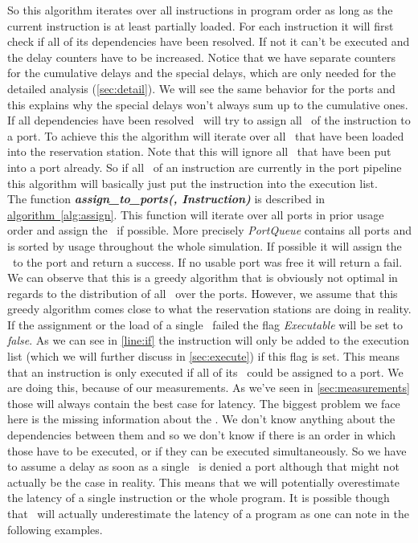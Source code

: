 So this algorithm iterates over all instructions in program order as long as the current instruction is at least partially loaded. For each instruction it will first check if all of its dependencies have been resolved. If not it can't be executed and the delay counters have to be increased. Notice that we have separate counters for the cumulative delays and the special delays, which are only needed for the detailed analysis (\autoref{sec:detail}). We will see the same behavior for the ports and this explains why the special delays won't always sum up to the cumulative ones.\\
If all dependencies have been resolved \suaca\ will try to assign all \microops\ of the instruction to a port. To achieve this the algorithm will iterate over all \microops\ that have been loaded into the reservation station. Note that this will ignore all \microops\ that have been put into a port already. So if all \microops\ of an instruction are currently in the port pipeline this algorithm will basically just put the instruction into the execution list.\\ 
The function \textbf{\emph{assign\_to\_ports(\microop, Instruction)}} is described in \hyperref[alg:assign]{algorithm~\ref*{alg:assign}}. This function will iterate over all ports in prior usage order and assign the \microop\ if possible. More precisely \emph{PortQueue} contains all ports and is sorted by usage throughout the whole simulation. If possible it will assign the \microop\ to the port and return a success. If no usable port was free it will return a fail.\\
We can observe that this is a greedy algorithm that is obviously not optimal in regards to the distribution of all \microops\ over the ports. However, we assume that this greedy algorithm comes close to what the reservation stations are doing in reality.\\
If the assignment or the load of a single \microop\ failed the flag \emph{Executable} will be set to \emph{false}. As we can see in \autoref{line:if} the instruction will only be added to the execution list (which we will further discuss in \autoref{sec:execute}) if this flag is set. This means that an instruction is only executed if all of its \microops\ could be assigned to a port. We are doing this, because of our measurements. As we've seen in \autoref{sec:measurements} those will always contain the best case for latency. The biggest problem we face here is the missing information about the \microops. We don't know anything about the dependencies between them and so we don't know if there is an order in which those have to be executed, or if they can be executed simultaneously. So we have to assume a delay as soon as a single \microop\ is denied a port although that might not actually be the case in reality. This means that we will potentially overestimate the latency of a single instruction or the whole program. It is possible though that \suaca\ will actually underestimate the latency of a program as one can note in the following examples.\\


